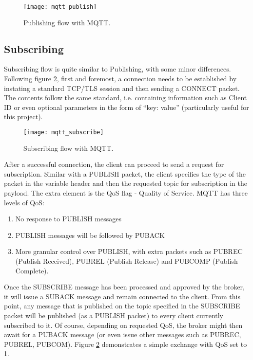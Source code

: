 \begin{figure}[ht]
    \centering
    \texttt{[image: mqtt\_publish]}
    \caption{Publishing flow with MQTT.}
    \label{fig:mqtt_publish}
\end{figure}


\subsection{Subscribing}\label{sec:sub}

Subscribing flow is quite similar to Publishing, with some minor differences. Following figure \ref{fig:mqtt_subscribe}, first and foremost, a connection needs to be established by instating a standard TCP/TLS session and then sending a CONNECT packet. The contents follow the same standard, i.e. containing information such as Client ID or even optional parameters in the form of ``key: value'' (particularly useful for this project).

\begin{figure}[ht]
    \centering
    \texttt{[image: mqtt\_subscribe]}
    \caption{Subscribing flow with MQTT.}
    \label{fig:mqtt_subscribe}
\end{figure}

After a successful connection, the client can proceed to send a request for subscription. Similar with a PUBLISH packet, the client specifies the type of the packet in the variable header and then the requested topic for subscription in the payload. The extra element is the QoS flag - Quality of Service. MQTT has three levels of QoS:
\begin{enumerate}\addtocounter{enumi}{-1}
  \item No response to PUBLISH messages
  \item PUBLISH messages will be followed by PUBACK
  \item More granular control over PUBLISH, with extra packets such as PUBREC (Publish Received), PUBREL (Publish Release) and PUBCOMP (Publish Complete).
\end{enumerate}

Once the SUBSCRIBE message has been processed and approved by the broker, it will issue a SUBACK message and remain connected to the client. From this point, any message that is published on the topic specified in the SUBSCRIBE packet will be published (as a PUBLISH packet) to every client currently subscribed to it. Of course, depending on requested QoS, the broker might then await for a PUBACK message (or even issue other messages such as PUBREC, PUBREL, PUBCOM). Figure \ref{fig:mqtt_subscribe} demonstrates a simple exchange with QoS set to 1. 

